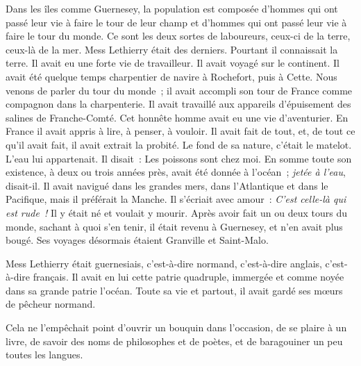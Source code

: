 \documentclass[french,twoside]{book} %
\begin{document}
Dans les îles comme Guernesey, la population est composée d’hommes qui ont passé leur vie à faire le tour de leur champ et d’hommes qui ont passé leur vie à faire le tour du monde. Ce sont les deux sortes de laboureurs, ceux-ci de la terre, ceux-là de la mer. Mess Lethierry était des derniers. Pourtant il connaissait la terre. Il avait eu une forte vie de travailleur. Il  avait voyagé sur le continent. Il avait été quelque temps charpentier de navire à Rochefort, puis à Cette. Nous venons de parler du tour du monde ; il avait accompli son tour de France comme compagnon dans la charpenterie. Il avait travaillé aux appareils d’épuisement des salines de Franche-Comté. Cet honnête homme avait eu une vie d’aventurier. En France il avait appris à lire, à penser, à vouloir. Il avait fait de tout, et, de tout ce qu’il avait fait, il avait extrait la probité. Le fond de sa nature, c’était le matelot. L’eau lui appartenait. Il disait : Les poissons sont chez moi. En somme toute son existence, à deux ou trois années près, avait été donnée à l’océan ; \emph{jetée à l’eau}, disait-il. Il avait navigué dans les grandes mers, dans l’Atlantique et dans le Pacifique, mais il préférait la Manche. Il s’écriait avec amour : \emph{C’est celle-là qui est rude !} Il y était né et voulait y mourir. Après avoir fait un ou deux tours du monde, sachant à quoi s’en tenir, il était revenu à Guernesey, et n’en avait plus bougé. Ses voyages désormais étaient Granville et Saint-Malo.\par
Mess Lethierry était guernesiais, c’est-à-dire normand, c’est-à-dire anglais, c’est-à-dire français. Il avait en lui cette patrie quadruple, immergée et comme noyée dans sa grande patrie l’océan. Toute sa vie et partout, il avait gardé ses mœurs de pêcheur normand.\par
Cela ne l’empêchait point d’ouvrir un bouquin dans l’occasion, de se plaire à un livre, de savoir des noms de philosophes et de poètes, et de baragouiner un peu toutes les langues.
\end{document}
